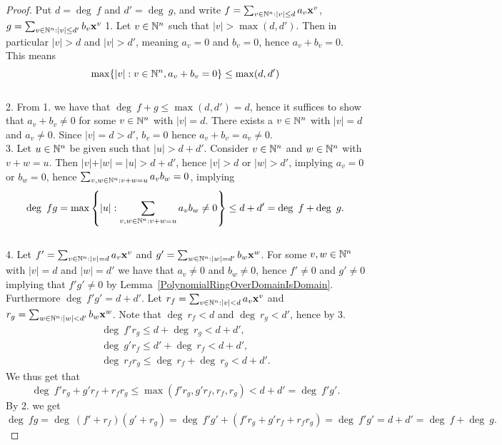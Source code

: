 \begin{proof}
Put $d = \deg \ f$ and $d' = \deg \ g$, and write $f = \sum_{v\in \mathbb{N}^n : \vert v\vert \leq d} a_v \mathbf{x}^v$, $g= \sum_{v\in \mathbb{N}^n : \vert v \vert \leq d'} b_v \mathbf{x}^v$
    1.  Let $v\in \mathbb{N}^n$ such that $\vert v\vert > \max(d,d')$. Then in particular $\vert v\vert > d$ and $\vert v\vert > d'$, meaning $a_v = 0$ and $b_v = 0$, hence $a_v+b_v =0$. This means 
    $$\max\{\vert v \vert : v\in \mathbb{N}^n , a_v+b_v = 0\} \leq \max(d,d')$$\\
    2. From 1. we have that $\deg \ f +g \leq \max(d,d') = d$, hence it suffices to show that $a_v+b_v \neq 0$ for some $v\in \mathbb{N}^n$ with $\vert v \vert = d$. There exists a $v\in \mathbb{N}^n$ with $\vert v\vert = d$ and $a_v \neq 0$. Since $\vert v \vert = d > d'$, $b_v = 0$ hence $a_v+b_v = a_v \neq 0$.\\
    3. Let $u\in \mathbb{N}^n$ be given such that $\vert u\vert > d+d'$. Consider $v\in \mathbb{N}^n$ and $w\in \mathbb{N}^n$ with $v+w = u$. Then $\vert v\vert + \vert w\vert = \vert u \vert >d+d'$, hence $\vert v\vert > d$ or $\vert w\vert > d'$, implying $a_v = 0$ or $b_w = 0$, hence $\sum_{v,w\in \mathbb{N}^n: v+w = u} a_vb_w = 0$, implying 
    $$\deg \ fg = \max\left\{\vert u\vert : \sum_{v,w\in \mathbb{N}^n : v+w = u} a_vb_w\neq 0 \right\} \leq d+d' = \deg \ f + \deg \ g.$$\\
    4. Let $f' = \sum_{v\in \mathbb{N}^n : \vert v \vert = d} a_v\mathbf{x}^v$ and $g' = \sum_{w\in \mathbb{N}^n : \vert w \vert = d'}b_w\mathbf{x}^w$. For some $v,w\in\mathbb{N}^n$ with $\vert v \vert = d$ and $\vert w\vert =d'$ we have that $a_v\neq 0$ and $b_w \neq 0$, hence $f' \neq 0$ and $g'\neq 0$ implying that $f'g'\neq 0$ by Lemma~\ref{PolynomialRingOverDomainIsDomain}. Furthermore $\deg \ f'g' = d+d'$. Let $r_f =  \sum_{v\in \mathbb{N}^n : \vert v \vert < d} a_v\mathbf{x}^v$ and $r_g = \sum_{w\in \mathbb{N}^n : \vert w \vert < d'}b_w\mathbf{x}^w$. Note that $\deg \ r_f < d$ and $\deg \ r_g < d'$, hence by 3. 
    \begin{gather*}
        \deg \ f'r_g \leq d + \deg\ r_g <d+d',\\
        \deg \ g'r_f \leq d' + \deg\ r_f <d+d',\\
        \deg \ r_fr_g \leq \deg \ r_f + \deg \ r_g < d+d'.
    \end{gather*}
    We thus get that 
    $$\deg \  f'r_g + g'r_f+ r_fr_g \leq \max(f'r_g,g'r_f,r_f,r_g) < d+d' = \deg \ f'g'.$$
    By 2. we get 
    $$\deg \ fg = \deg \ (f'+r_f)(g'+r_g) = \deg \ f'g'+( f'r_g + g'r_f+ r_fr_g) = \deg \ f'g' = d+d'=\deg\  f + \deg \ g.$$
\end{proof}
